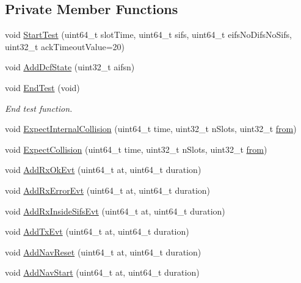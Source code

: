\subsection*{Private Member Functions}
\begin{DoxyCompactItemize}
\item 
void \hyperlink{classDcfManagerTest_a5e7a2ff4209e9602aea95d4efa51ae91}{Start\+Test} (uint64\+\_\+t slot\+Time, uint64\+\_\+t sifs, uint64\+\_\+t eifs\+No\+Difs\+No\+Sifs, uint32\+\_\+t ack\+Timeout\+Value=20)
\item 
void \hyperlink{classDcfManagerTest_ab48a072efc828fc250036b45c3db1832}{Add\+Dcf\+State} (uint32\+\_\+t aifsn)
\item 
void \hyperlink{classDcfManagerTest_acc78df96a60d77fdb57a9f93029dca6c}{End\+Test} (void)
\begin{DoxyCompactList}\small\item\em End test function. \end{DoxyCompactList}\item 
void \hyperlink{classDcfManagerTest_a306986d8305838006b446a549da98a4e}{Expect\+Internal\+Collision} (uint64\+\_\+t time, uint32\+\_\+t n\+Slots, uint32\+\_\+t \hyperlink{lte__amc_8m_a1b4c81ff74eb1a626b5ade44c81004b3}{from})
\item 
void \hyperlink{classDcfManagerTest_a1f78350a941a4ca0e28260c8f6390e45}{Expect\+Collision} (uint64\+\_\+t time, uint32\+\_\+t n\+Slots, uint32\+\_\+t \hyperlink{lte__amc_8m_a1b4c81ff74eb1a626b5ade44c81004b3}{from})
\item 
void \hyperlink{classDcfManagerTest_afc9e919cbe6497efb6a1b10d484de251}{Add\+Rx\+Ok\+Evt} (uint64\+\_\+t at, uint64\+\_\+t duration)
\item 
void \hyperlink{classDcfManagerTest_a9e21293e0feca0c3d7b953d13c494c8d}{Add\+Rx\+Error\+Evt} (uint64\+\_\+t at, uint64\+\_\+t duration)
\item 
void \hyperlink{classDcfManagerTest_ae4d9c6e0db3b3a2f82c14eaf955549f9}{Add\+Rx\+Inside\+Sifs\+Evt} (uint64\+\_\+t at, uint64\+\_\+t duration)
\item 
void \hyperlink{classDcfManagerTest_a948ed481ee010a8ccc1b434022ed962d}{Add\+Tx\+Evt} (uint64\+\_\+t at, uint64\+\_\+t duration)
\item 
void \hyperlink{classDcfManagerTest_adeb587a9b0e5ce26c2e0de1c7cac89db}{Add\+Nav\+Reset} (uint64\+\_\+t at, uint64\+\_\+t duration)
\item 
void \hyperlink{classDcfManagerTest_aab6992dad86bfd6cefe981b43674524d}{Add\+Nav\+Start} (uint64\+\_\+t at, uint64\+\_\+t duration)

\end{DoxyCompactItemize}
